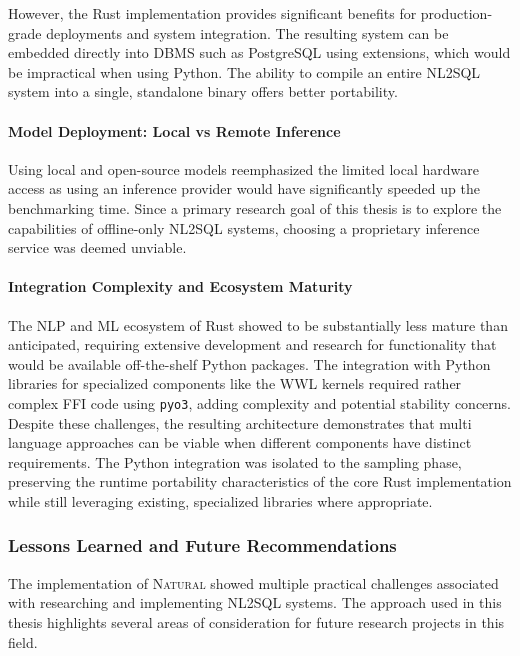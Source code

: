 However, the Rust implementation provides significant benefits for
production-grade deployments and system integration. The resulting system can
be embedded directly into DBMS such as PostgreSQL using extensions, which would
be impractical when using Python. The ability to compile an entire NL2SQL
system into a single, standalone binary offers better portability.

\paragraph{Model Deployment: Local vs Remote Inference}

Using local and open-source models reemphasized the limited local hardware
access as using an inference provider would have significantly speeded up the
benchmarking time. Since a primary research goal of this thesis is to explore
the capabilities of offline-only NL2SQL systems, choosing a proprietary
inference service was deemed unviable.

\paragraph{Integration Complexity and Ecosystem Maturity}

The NLP and ML ecosystem of Rust showed to be substantially less mature than
anticipated, requiring extensive development and research for functionality
that would be available off-the-shelf Python packages. The integration with
Python libraries for specialized components like the WWL
kernels required rather complex FFI code using \texttt{pyo3}, adding
complexity and potential stability concerns. Despite these challenges, the
resulting architecture demonstrates that multi language approaches can be
viable when different components have distinct requirements. The Python
integration was isolated to the sampling phase, preserving the runtime
portability characteristics of the core Rust implementation while still
leveraging existing, specialized libraries where appropriate.

\subsubsection{Lessons Learned and Future Recommendations}

The implementation of \textsc{Natural} showed multiple practical challenges
associated with researching and implementing NL2SQL systems. The approach used
in this thesis highlights several areas of consideration for future research
projects in this field.

